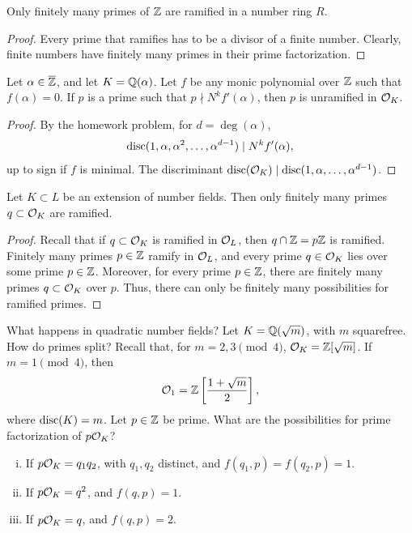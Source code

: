 \begin{corollary} \label{cor:finitely_many_primes_of_Z_ramified}
    Only finitely many primes of $\mathbb Z$ are ramified in a number ring $R$.
\end{corollary}
\begin{proof}
    Every prime that ramifies has to be a divisor of a finite number. Clearly, finite numbers have finitely many primes in their prime factorization.
\end{proof}

\begin{corollary} \label{cor:ramification_test}
    Let $\alpha \in \overline {\mathbb Z}$, and let $K = \mathbb Q(\alpha)$. Let $f$ be any monic polynomial over $\mathbb Z$ such that $f(\alpha) = 0$. If $p$ is a prime such that $p \nmid N^k f'(\alpha)$, then $p$ is unramified in $\mathcal O_K$.
\end{corollary}
\begin{proof}
    By the homework problem, for $d = \deg (\alpha)$,
    \[ \operatorname{disc}(1, \alpha, \alpha^2, \dots, \alpha^{d-1}) \mid N^k f'(\alpha), \]
    up to sign if $f$ is minimal. The discriminant $\operatorname{disc}(\mathcal O_K) \mid \operatorname{disc}(1, \alpha, \dots, \alpha^{d-1})$.
\end{proof}

\begin{corollary} \label{cor:finitely_many_primes_of_extension_ramified}
    Let $K \subset L$ be an extension of number fields. Then only finitely many primes $q \subset \mathcal O_K$ are ramified.
\end{corollary}
\begin{proof}
    Recall that if $q \subset \mathcal O_K$ is ramified in $\mathcal O_L$, then $q \cap \mathbb Z = p \mathbb Z$ is ramified. Finitely many primes $p \in \mathbb Z$ ramify in $\mathcal O_L$, and every prime $q \in \mathcal O_K$ lies over some prime $p \in \mathbb Z$. Moreover, for every prime $p \in \mathbb Z$, there are finitely many primes $q \subset \mathcal O_K$ over $p$. Thus, there can only be finitely many possibilities for ramified primes.
\end{proof}

What happens in quadratic number fields? Let $K = \mathbb Q(\sqrt m)$, with $m$ squarefree. How do primes split? Recall that, for $m = 2, 3 \pmod{4}$, $\mathcal O_K = \mathbb Z[\sqrt{m}]$. If $m = 1 \pmod{4}$, then
\[ \mathcal O_1 = \mathbb Z \left[\frac{1 + \sqrt m}{2}\right], \]
where $\operatorname{disc}(K) = m$. Let $p \in \mathbb Z$ be prime. What are the possibilities for prime factorization of $p \mathcal O_K$?
\begin{enumerate}[(i)]
    \item If $p \mathcal O_K = q_1 q_2$, with $q_1, q_2$ distinct, and $f(q_1, p) = f(q_2, p) = 1$.
    \item If $p \mathcal O_K = q^2$, and $f(q, p) = 1$.
    \item If $p \mathcal O_K = q$, and $f(q, p) = 2$.
\end{enumerate}

